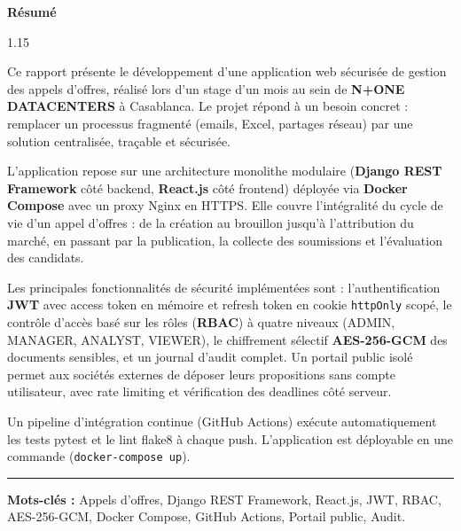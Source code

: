 \hskip7mm
\vspace{3cm}
\begin{center}
{\textbf{\Huge Résumé}}
\end{center}
\vspace{1cm}

\begin{spacing}{1.15}

{\large
Ce rapport présente le développement d'une application web sécurisée de gestion
des appels d'offres, réalisé lors d'un stage d'un mois au sein de \textbf{N+ONE DATACENTERS}
à Casablanca. Le projet répond à un besoin concret : remplacer un processus fragmenté
(emails, Excel, partages réseau) par une solution centralisée, traçable et sécurisée.
}
\vspace{0.4cm}

{\large
L'application repose sur une architecture monolithe modulaire (\textbf{Django REST Framework}
côté backend, \textbf{React.js} côté frontend) déployée via \textbf{Docker Compose}
avec un proxy Nginx en HTTPS. Elle couvre l'intégralité du cycle de vie d'un appel
d'offres : de la création au brouillon jusqu'à l'attribution du marché, en passant
par la publication, la collecte des soumissions et l'évaluation des candidats.
}
\vspace{0.4cm}

{\large
Les principales fonctionnalités de sécurité implémentées sont :
l'authentification \textbf{JWT} avec access token en mémoire et refresh token en cookie
\texttt{httpOnly} scopé, le contrôle d'accès basé sur les rôles (\textbf{RBAC}) à quatre
niveaux (ADMIN, MANAGER, ANALYST, VIEWER), le chiffrement sélectif
\textbf{AES-256-GCM} des documents sensibles, et un journal d'audit complet.
Un portail public isolé permet aux sociétés externes de déposer leurs propositions
sans compte utilisateur, avec rate limiting et vérification des deadlines côté serveur.
}
\vspace{0.4cm}

{\large
Un pipeline d'intégration continue (GitHub Actions) exécute automatiquement
les tests pytest et le lint flake8 à chaque push. L'application est déployable
en une commande (\texttt{docker-compose up}).
}
\vspace{0.8cm}

\noindent\rule{\linewidth}{0.4pt}
\vspace{0.3cm}

\noindent
{\large \textbf{Mots-clés :} Appels d'offres, Django REST Framework, React.js,
JWT, RBAC, AES-256-GCM, Docker Compose, GitHub Actions, Portail public, Audit.}

\end{spacing}

